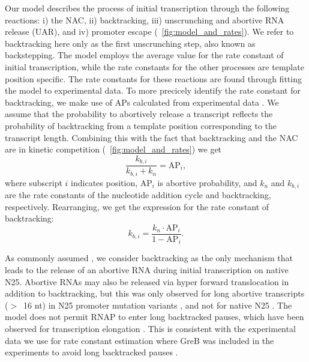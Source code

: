 %

Our model describes the process of initial transcription through the following
reactions: i) the NAC, ii) backtracking, iii) unscrunching and abortive RNA
release (UAR), and iv) promoter escape (\FIG~\ref{fig:model_and_rates}).  We
refer to backtracking here only as the first unscrunching step, also known as
backstepping. The model employs the average value for the rate constant of
initial transcription, while the rate constants for the other processes are
template position specific. The rate constants for these reactions are found
through fitting the model to experimental data. To more precicely identify the
rate constant for backtracking, we make use of APs calculated from
experimental data \cite{hsu_quantitative_1996}. We assume that the probability
to abortively release a transcript reflects the probability of backtracking
from a template position corresponding to the transcript length. Combining
this with the fact that backtracking and the NAC are in kinetic competition
(\FIG~\ref{fig:model_and_rates}) we get
\begin{equation*}
  \frac{k_{b,i}}{k_{b,i} + k_n} = \text{AP}_i,
\end{equation*}
where subscript $i$ indicates position, AP$_i$ is abortive probability, and
$k_n$ and $k_{b,i}$ are the rate constants of the nucleotide addition cycle
and backtracking, respectively. Rearranging, we get the expression for the
rate constant of backtracking:
\begin{equation}
  k_{b,i} = \frac{k_n\cdot\text{AP}_i}{1-\text{AP}_i}.
  \label{eq:backtrackingcalc}
\end{equation}

As commonly assumed \cite{xue_kinetic_2008,tang_real-time_2009}, we consider 
backtracking as the only mechanism that leads to the release of an abortive
RNA during initial transcription on native N25. Abortive RNAs may also be released
via hyper forward translocation in addition to backtracking, but this was only
observed for long abortive transcripts ($>$~16 nt) in N25 promoter mutation
variants \cite{chander_alternate_2007, chander_mechanisms_2015}, and not for
native N25 \cite{chander_alternate_2007}. The model does not permit RNAP to
enter long backtracked pauses, which have been observed for transcription
elongation \cite{shaevitz_backtracking_2003}. This is consistent with the
experimental data we use for rate constant estimation where GreB was included
in the experiments to avoid long backtracked pauses
\cite{revyakin_abortive_2006}.


